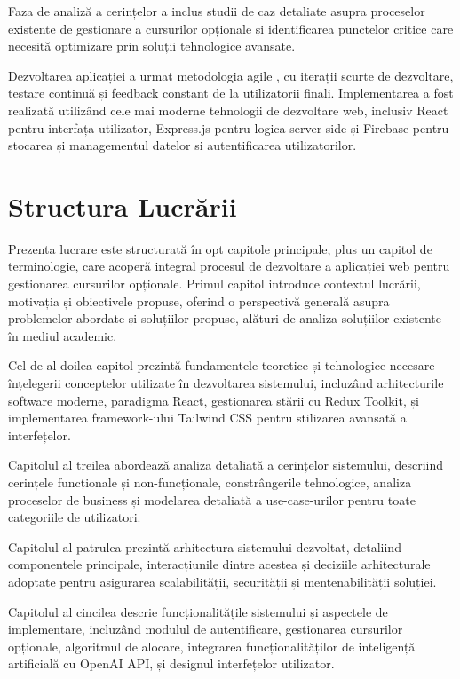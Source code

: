\documentclass[12pt,a4paper]{report}
\begin{document}
Faza de analiză a cerințelor a inclus studii de caz detaliate asupra proceselor existente de gestionare a cursurilor opționale și identificarea punctelor critice care necesită optimizare prin soluții tehnologice avansate.

Dezvoltarea aplicației a urmat metodologia agile \cite{agile-manifesto}, cu iterații scurte de dezvoltare, testare continuă și feedback constant de la utilizatorii finali. Implementarea a fost realizată utilizând cele mai moderne tehnologii de dezvoltare web, inclusiv React pentru interfața utilizator, Express.js pentru logica server-side și Firebase pentru stocarea și managementul datelor si autentificarea utilizatorilor.

\section{Structura Lucrării}

Prezenta lucrare este structurată în opt capitole principale, plus un capitol de terminologie, care acoperă integral procesul de dezvoltare a aplicației web pentru gestionarea cursurilor opționale. Primul capitol introduce contextul lucrării, motivația și obiectivele propuse, oferind o perspectivă generală asupra problemelor abordate și soluțiilor propuse, alături de analiza soluțiilor existente în mediul academic.

Cel de-al doilea capitol prezintă fundamentele teoretice și tehnologice necesare înțelegerii conceptelor utilizate în dezvoltarea sistemului, incluzând arhitecturile software moderne, paradigma React, gestionarea stării cu Redux Toolkit, și implementarea framework-ului Tailwind CSS pentru stilizarea avansată a interfețelor.

Capitolul al treilea abordează analiza detaliată a cerințelor sistemului, descriind cerințele funcționale și non-funcționale, constrângerile tehnologice, analiza proceselor de business și modelarea detaliată a use-case-urilor pentru toate categoriile de utilizatori.

Capitolul al patrulea prezintă arhitectura sistemului dezvoltat, detaliind componentele principale, interacțiunile dintre acestea și deciziile arhitecturale adoptate pentru asigurarea scalabilității, securității și mentenabilității soluției.

Capitolul al cincilea descrie funcționalitățile sistemului și aspectele de implementare, incluzând modulul de autentificare, gestionarea cursurilor opționale, algoritmul de alocare, integrarea funcționalităților de inteligență artificială cu OpenAI API, și designul interfețelor utilizator.
\end{document}
